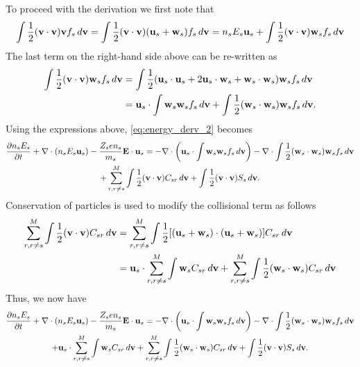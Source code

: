 \documentclass[a4paper,11pt]{report}
\begin{document}
To proceed with the derivation we first note that
\begin{multline}
\int \frac{1}{2} (\mathbf{v} \cdot \mathbf{v}) \mathbf{v} f_s \, d\mathbf{v} = \int \frac{1}{2} (\mathbf{v} \cdot \mathbf{v}) (\mathbf{u}_s + \mathbf{w}_s) f_s \, d\mathbf{v} = n_s E_s \mathbf{u}_s + \int \frac{1}{2} (\mathbf{v} \cdot \mathbf{v} ) \mathbf{w}_s f_s \, d\mathbf{v}
\end{multline}
The last term on the right-hand side above can be re-written as
\begin{align}
\int \frac{1}{2} ( \mathbf{v} \cdot \mathbf{v} ) \mathbf{w}_s f_s \, d\mathbf{v} &= \int \frac{1}{2} ( \mathbf{u}_s \cdot \mathbf{u}_s + 2\mathbf{u}_s \cdot \mathbf{w}_s + \mathbf{w}_s \cdot \mathbf{w}_s ) \mathbf{w}_s f_s \, d\mathbf{v} \\
& =  \mathbf{u}_s \cdot \int \mathbf{w}_s \mathbf{w}_s f_s \, d\mathbf{v} + \int \frac{1}{2} ( \mathbf{w}_s \cdot \mathbf{w}_s ) \mathbf{w}_s f_s \, d\mathbf{v}.
\end{align}
Using the expressions above, \cref{eq:energy_derv_2} becomes
\begin{multline}
\label{eq:energy_derv_3}
\frac{\partial n_s E_s}{\partial t} + \nabla \cdot (n_s E_s \mathbf{u}_s ) - \frac{Z_s e n_s}{m_s} \mathbf{E} \cdot \mathbf{u}_s =  - \nabla \cdot \left ( \mathbf{u}_s \cdot \int \mathbf{w}_s \mathbf{w}_s f_s \, d\mathbf{v} \right ) - \nabla \cdot \int \frac{1}{2} ( \mathbf{w}_s \cdot \mathbf{w}_s ) \mathbf{w}_s f_s \, d\mathbf{v}\\
+ \sum_{r, r \ne s}^M \int \frac{1}{2} (\mathbf{v} \cdot \mathbf{v}) C_{s r} \, d\mathbf{v} + \int \frac{1}{2} (\mathbf{v} \cdot \mathbf{v}) S_s \, d\mathbf{v}.
\end{multline}
Conservation of particles is used to modify the collisional term as follows
\begin{align}
    \label{eq:energy_collision_expansion}
    \sum_{r,r \ne s}^M \int \frac{1}{2} (\mathbf{v} \cdot \mathbf{v}) C_{s r} \, d\mathbf{v} 
    &= \sum_{r,r \ne s}^M \int \frac{1}{2} [ (\mathbf{u}_s + \mathbf{w}_s) \cdot (\mathbf{u}_s + \mathbf{w}_s)] C_{s r} \, d\mathbf{v} \nonumber \\
    &= \mathbf{u}_s \cdot  \sum_{r,r \ne s}^M \int \mathbf{w}_s C_{s r} \, d\mathbf{v} + \sum_{r,r \ne s}^M \int \frac{1}{2} (\mathbf{w}_s \cdot \mathbf{w}_s) C_{s r} \, d\mathbf{v} 
\end{align}
Thus, we now have
\begin{multline}
\label{eq:energy_derv_4}
\frac{\partial n_s E_s}{\partial t} + \nabla \cdot (n_s E_s \mathbf{u}_s ) - \frac{Z_s e n_s}{m_s} \mathbf{E} \cdot \mathbf{u}_s = - \nabla \cdot \left ( \mathbf{u}_s \cdot \int \mathbf{w}_s \mathbf{w}_s f_s \, d\mathbf{v}  \right ) - \nabla \cdot \int \frac{1}{2} ( \mathbf{w}_s \cdot \mathbf{w}_s ) \mathbf{w}_s f_s \, d\mathbf{v} \\
+ \mathbf{u}_s \cdot \sum_{r,r \ne s}^M \int \mathbf{w}_s C_{s r} \, d\mathbf{v} + \sum_{r, r \ne s}^M \int \frac{1}{2} (\mathbf{w}_s \cdot \mathbf{w}_s) C_{s r} \, d\mathbf{v} + \int \frac{1}{2} (\mathbf{v} \cdot \mathbf{v}) S_s \, d\mathbf{v}.
\end{multline}
\end{document}
